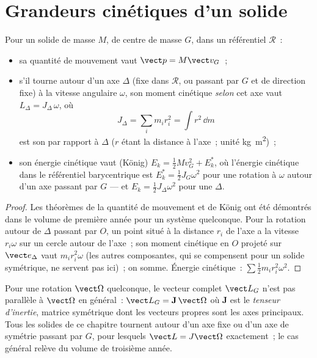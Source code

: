 \section{Grandeurs cinétiques d'un solide}

\begin{proposition}\label{prop:b2:rigid-body-mechanics:kinetic}
Pour un solide de masse $M$, de centre de masse $G$, dans un référentiel $\mathcal R$~:
\begin{itemize}
  \item sa quantité de mouvement vaut $\vect p = M\vect v_G$~;
  \item s'il tourne autour d'un axe $\Delta$ (fixe dans $\mathcal R$, ou
        passant par $G$ et de direction fixe) à la vitesse angulaire
        $\omega$, son moment cinétique \emph{selon} cet axe vaut
        $L_\Delta = J_\Delta\,\omega$, où
        \[
        J_\Delta = \sum_i m_i r_i^2 = \int r^2\,\dd m
        \]
        est son \emph{} par rapport à $\Delta$ ($r$ étant la distance à
        l'axe~; unité \unit{kg.m^2})~;
  \item son énergie cinétique vaut (König) $E_k = \tfrac12Mv_G^2 +
        E_k^*$, où l'énergie cinétique dans le référentiel barycentrique est
        $E_k^* = \tfrac12J_{G}\omega^2$ pour une rotation à $\omega$ autour
        d'un axe passant par $G$ --- et $E_k = \tfrac12J_\Delta\omega^2$ pour une
         $\Delta$.
\end{itemize}
\end{proposition}

\begin{proof}
Les théorèmes de la quantité de mouvement et de König ont été démontrés
dans le volume de première année pour un système quelconque. Pour la
rotation autour de $\Delta$ passant par $O$, un point situé à la
distance $r_i$ de l'axe a la vitesse $r_i\omega$ sur un cercle autour de
l'axe~; son moment cinétique en $O$ projeté sur $\vect e_\Delta$ vaut
$m_ir_i^2\omega$ (les autres composantes, qui se compensent pour un solide
symétrique, ne servent pas ici)~; on somme. Énergie cinétique~: $\sum\tfrac12m_ir_i^2
\omega^2$.
\end{proof}

\begin{remark}\label{rem:b2:rigid-body-mechanics:tensor}
Pour une rotation $\vect\Omega$ quelconque, le vecteur complet $\vect L_G$ n'est
pas parallèle à $\vect\Omega$ en général~: $\vect L_G = \mathbf J\,\vect\Omega$
où $\mathbf J$ est le \emph{tenseur d'inertie}, matrice symétrique dont les
vecteurs propres sont les axes principaux. Tous les solides de ce chapitre
tournent autour d'un axe fixe ou d'un axe de symétrie passant par $G$, pour
lesquels $\vect L = J\vect\Omega$ exactement~; le cas général relève du
volume de troisième année.
\end{remark}

